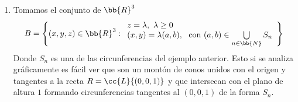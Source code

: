 \begin{ejemplo}
\begin{enumerate}
        \item Tomamos el conjunto de $\bb{R}^3$
        \begin{gather*}
            B = \left\{ (x,y,z)\in \bb{R}^3 : 
                \begin{array}{l}
                    z=\lambda,\ \lambda \geq 0\\
                    (x,y) = \lambda(a,b),\ \text{ con } (a,b)\in \bigcup\limits_{n\in \bb{N}}S_n
                \end{array}
            \right\}
        \end{gather*}
        Donde $S_n$ es una de las circunferencias del ejemplo anterior. Esto si se analiza gráficamente es fácil ver que son un montón de conos unidos con el origen y tangentes a la recta $R = \cc{L}\{(0,0,1)\}$ y que intersecan con el plano de altura $1$ formando circunferencias tangentes al $(0,0,1)$ de la forma $S_n$.

        \begin{figure}[H]
            \centering  
\end{figure}
\end{enumerate}
\end{ejemplo}
